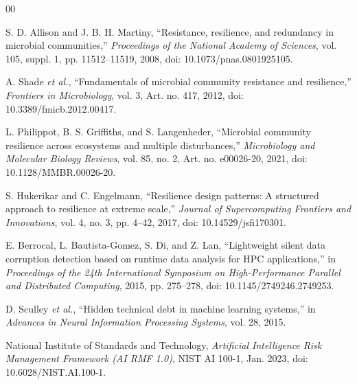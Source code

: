 \documentclass[conference]{IEEEtran}
\begin{document}
\begin{thebibliography}{00}

S. D. Allison and J. B. H. Martiny, ``Resistance, resilience, and redundancy in microbial communities,'' \emph{Proceedings of the National Academy of Sciences}, vol. 105, suppl. 1, pp. 11512--11519, 2008, doi: 10.1073/pnas.0801925105.

A. Shade \emph{et al.}, ``Fundamentals of microbial community resistance and resilience,'' \emph{Frontiers in Microbiology}, vol. 3, Art. no. 417, 2012, doi: 10.3389/fmicb.2012.00417.

L. Philippot, B. S. Griffiths, and S. Langenheder, ``Microbial community resilience across ecosystems and multiple disturbances,'' \emph{Microbiology and Molecular Biology Reviews}, vol. 85, no. 2, Art. no. e00026-20, 2021, doi: 10.1128/MMBR.00026-20.

S. Hukerikar and C. Engelmann, ``Resilience design patterns: A structured approach to resilience at extreme scale,'' \emph{Journal of Supercomputing Frontiers and Innovations}, vol. 4, no. 3, pp. 4--42, 2017, doi: 10.14529/jsfi170301.

E. Berrocal, L. Bautista-Gomez, S. Di, and Z. Lan, ``Lightweight silent data corruption detection based on runtime data analysis for HPC applications,'' in \emph{Proceedings of the 24th International Symposium on High-Performance Parallel and Distributed Computing}, 2015, pp. 275--278, doi: 10.1145/2749246.2749253.

D. Sculley \emph{et al.}, ``Hidden technical debt in machine learning systems,'' in \emph{Advances in Neural Information Processing Systems}, vol. 28, 2015.

National Institute of Standards and Technology, \emph{Artificial Intelligence Risk Management Framework (AI RMF 1.0)}, NIST AI 100-1, Jan. 2023, doi: 10.6028/NIST.AI.100-1.

\end{thebibliography}
\end{document}
